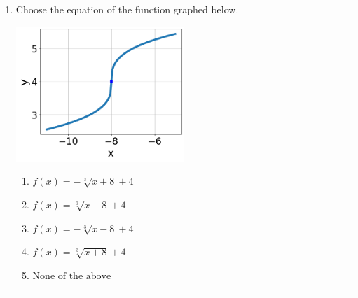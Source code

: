 \documentclass[14pt]{extbook}
\newcommand{\litem}[1]{\item#1\hspace*{-1cm}\rule{\textwidth}{0.4pt}}
\begin{document}
\begin{enumerate}
{\begin{enumerate}[label=\Alph*.]
\end{enumerate} }
\litem{
Choose the equation of the function graphed below.
\begin{center}
    \includegraphics[width=0.5\textwidth]{../Figures/radicalGraphToEquationB.png}
\end{center}
\begin{enumerate}[label=\Alph*.]
\item \( f(x) = - \sqrt[3]{x + 8} + 4 \)
\item \( f(x) = \sqrt[3]{x - 8} + 4 \)
\item \( f(x) = - \sqrt[3]{x - 8} + 4 \)
\item \( f(x) = \sqrt[3]{x + 8} + 4 \)
\item \( \text{None of the above} \)


\end{enumerate}}
\end{enumerate}
\end{document}
